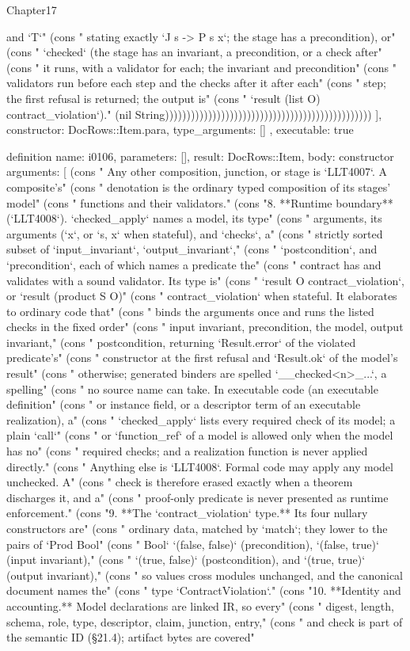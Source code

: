 \begin{lexlean}{Chapter17}
\begin{semanticmodule}
{{and `T`" (cons "     stating exactly `J s -> P s x`; the stage has a precondition), or" (cons "     `checked` (the stage has an invariant, a precondition, or a check after" (cons "     it runs, with a validator for each; the invariant and precondition" (cons "     validators run before each step and the checks after it after each" (cons "     step; the first refusal is returned; the output is" (cons "     `result (list O) contract_violation`)." (nil String))))))))))))))))))))))))))))))))))))))))))))))))
    ],
    constructor: DocRows::Item.para,
    type_arguments: []
  },
  executable: true
}

definition{
  name: i0106,
  parameters: [],
  result: DocRows::Item,
  body: constructor{
    arguments: [
      (cons "   Any other composition, junction, or stage is `LLT4007`. A composite's" (cons "   denotation is the ordinary typed composition of its stages' model" (cons "   functions and their validators." (cons "8. **Runtime boundary** (`LLT4008`). `checked_apply` names a model, its type" (cons "   arguments, its arguments (`x`, or `s, x` when stateful), and `checks`, a" (cons "   strictly sorted subset of `input_invariant`, `output_invariant`," (cons "   `postcondition`, and `precondition`, each of which names a predicate the" (cons "   contract has and validates with a sound validator. Its type is" (cons "   `result O contract_violation`, or `result (product S O)" (cons "   contract_violation` when stateful. It elaborates to ordinary code that" (cons "   binds the arguments once and runs the listed checks in the fixed order" (cons "   input invariant, precondition, the model, output invariant," (cons "   postcondition, returning `Result.error` of the violated predicate's" (cons "   constructor at the first refusal and `Result.ok` of the model's result" (cons "   otherwise; generated binders are spelled `__checked<n>_...`, a spelling" (cons "   no source name can take. In executable code (an executable definition" (cons "   or instance field, or a descriptor term of an executable realization), a" (cons "   `checked_apply` lists every required check of its model; a plain `call`" (cons "   or `function_ref` of a model is allowed only when the model has no" (cons "   required checks; and a realization function is never applied directly." (cons "   Anything else is `LLT4008`. Formal code may apply any model unchecked. A" (cons "   check is therefore erased exactly when a theorem discharges it, and a" (cons "   proof-only predicate is never presented as runtime enforcement." (cons "9. **The `contract_violation` type.** Its four nullary constructors are" (cons "   ordinary data, matched by `match`; they lower to the pairs of `Prod Bool" (cons "   Bool` `(false, false)` (precondition), `(false, true)` (input invariant)," (cons "   `(true, false)` (postcondition), and `(true, true)` (output invariant)," (cons "   so values cross modules unchanged, and the canonical document names the" (cons "   type `ContractViolation`." (cons "10. **Identity and accounting.** Model declarations are linked IR, so every" (cons "    digest, length, schema, role, type, descriptor, claim, junction, entry," (cons "    and check is part of the semantic ID (§21.4); artifact bytes are covered" }}
\end{semanticmodule}
\end{lexlean}
